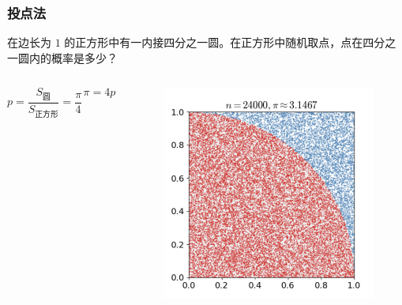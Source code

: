 \documentclass{beamer}
\begin{document}
\begin{frame}
    \frametitle{投点法}

    \begin{problem}
        在边长为 $1$ 的正方形中有一内接四分之一圆。在正方形中随机取点，点在四分之一圆内的概率是多少？   
    \end{problem}

    \begin{columns}

        \pause

        $$p = \frac{S_{\text{圆}}}{S_{\text{正方形}}} = \frac{\pi}{4}$$
    
        $$\pi = 4p$$


        \begin{figure}
            \centering
            \includegraphics[scale=0.12]{res/pi_calc.png}
        \end{figure}
    \end{columns}

\end{frame}
\end{document}
